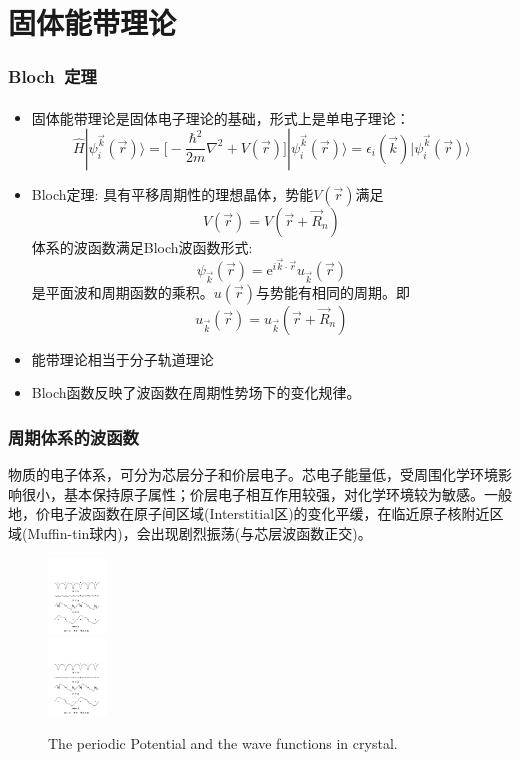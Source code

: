 \documentclass[cjk,slidestop,compress,mathserif,blue]{beamer}
\newcommand{\upcite}[1]{\hspace{0ex}\textsuperscript{\cite{#1}}} %
\begin{document}
\section{固体能带理论}       %
\frame
{
	\frametitle{\textrm{Bloch~}定理}
\begin{itemize}%
   \setlength{\itemsep}{8pt}
   \item 固体能带理论\upcite{Huang_Han}是固体电子理论的基础，形式上是单电子理论：
    $$\hat H |\psi_i^{\vec k}(\vec r)\rangle=\bigg[-\dfrac{\hbar^2}{2m}\nabla^2+V(\vec r)\bigg]|\psi_i^{\vec k}(\vec r)\rangle=\epsilon_i(\vec k)|\psi_i^{\vec k}(\vec r)\rangle$$
  \item \textrm{Bloch}定理:
具有平移周期性的理想晶体，势能$V(\vec r)$满足$$V(\vec r)=V(\vec r+\vec R_n)$$
体系的波函数满足\textrm{Bloch}波函数形式:$$\psi_{\vec k}(\vec r)=\textrm{e}^{i\vec k\cdot\vec r}u_{\vec k}(\vec r)$$
是平面波和周期函数的乘积。$u(\vec r)$与势能有相同的周期。即$$u_{\vec k}(\vec r)=u_{\vec k}(\vec r+\vec R_n)$$
  \item 能带理论相当于分子轨道理论
\item \textrm{Bloch}函数反映了波函数在周期性势场下的变化规律。
\end{itemize}
}

\frame
{
\frametitle{周期体系的波函数}
物质的电子体系，可分为芯层分子和价层电子。芯电子能量低，受周围化学环境影响很小，基本保持原子属性；价层电子相互作用较强，对化学环境较为敏感。一般地，价电子波函数在原子间区域(\textrm{Interstitial}区)的变化平缓，在临近原子核附近区域(\textrm{Muffin-tin}球内)，会出现剧烈振荡(与芯层波函数正交)。
\begin{figure}[h!]
\centering
\includegraphics[height=0.8in,width=4.in,viewport=41 433 539 546,clip]{Figures/Pseudo_wave.pdf}\\
\includegraphics[height=0.8in,width=4.in,viewport=41 210 539 339,clip]{Figures/Pseudo_wave.pdf}
\caption{\tiny \textrm{The periodic Potential and the wave functions in crystal.}}%
\label{Potential-Wave}
\end{figure}
}
\end{document}
